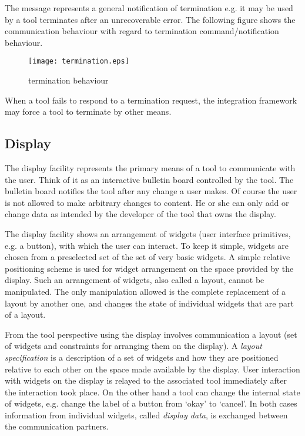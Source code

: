 \documentclass{article}
\begin{document}
   \enlargethispage*{30pt}

   \noindent The message represents a general notification of termination e.g.
   it may be used by a tool terminates after an unrecoverable error.
   The following figure shows the communication behaviour with regard to
   termination command/notification behaviour.

   \begin{figure}[H]
    \begin{center}
     \texttt{[image: termination.eps]}
    \end{center}
    \vspace{-0.5cm}
    \caption{termination behaviour}
   \end{figure} 
   
   \noindent When a tool fails to respond to a termination request, the
   integration framework may force a tool to terminate by other means.

  \subsection{Display} \label{ss:user_interaction}

   The display facility represents the primary means of a tool to communicate
   with the user.  Think of it as an interactive bulletin board controlled by
   the tool. The bulletin board notifies the tool after any change a user
   makes. Of course the user is not allowed to make arbitrary changes to
   content. He or she can only add or change data as intended by the developer
   of the tool that owns the display.

   The display facility shows an arrangement of widgets (user interface
   primitives, e.g. a button), with which the user can interact. To keep it
   simple, widgets are chosen from a preselected set of the set of very basic
   widgets. A simple relative positioning scheme is used for widget arrangement
   on the space provided by the display. Such an arrangement of widgets, also
   called a layout, cannot be manipulated. The only manipulation allowed is
   the complete replacement of a layout by another one, and changes the state of
   individual widgets that are part of a layout.

   From the tool perspective using the display involves communication a layout
   (set of widgets and constraints for arranging them on the display).  A
   \textit{layout specification} is a description of a set of widgets and how
   they are positioned relative to each other on the space made available by
   the display. User interaction with widgets on the display is relayed to the
   associated tool immediately after the interaction took place. On the other
   hand a tool can change the internal state of widgets, e.g. change the label
   of a button from `okay' to `cancel'. In both cases information from
   individual widgets, called \textit{display data}, is exchanged between the
   communication partners.
\end{document}
